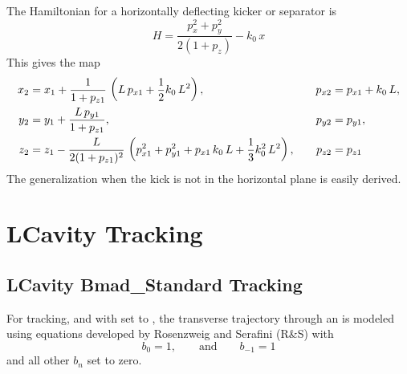 The Hamiltonian for a horizontally deflecting kicker or separator is
\begin{equation}
  H = \frac{p_x^2 + p_y^2}{2 (1 + p_z)} - k_0 \, x 
\end{equation}
This gives the map
\begin{alignat}{2}
  x_2 &= x_1 + \frac{1}{1 + p_{z1}} \, \left( L \, p_{x1} + \frac{1}{2} k_0 \, L^2 \right), &
    p_{x2} &= p_{x1} + k_0 \, L, \nonumber \\
  y_2 &= y_1 + \frac{L \, p_{y1}}{1 + p_{z1}}, &
    p_{y2} &= p_{y1},  \\
  z_2 &= z_1 - \frac{L}{2 (1 + p_{z1})^2} \, 
    \left( p_{x1}^2 + p_{y1}^2 + p_{x1} \, k_0 \, L + \frac{1}{3} k_0^2 \, L^2 \right), \quad &
  p_{z2} &= p_{z1} \nonumber
\end{alignat}
The generalization when the kick is not in the horizontal plane is easily derived.

\section{LCavity Tracking}
\label{s:lcavity.std}

\subsection{LCavity Bmad\_Standard Tracking}

For  tracking, and with  set to , the transverse
trajectory through an  is modeled using equations developed by Rosenzweig and
Serafini\cite{b:rosenzweig} (R\&S) with
\begin{equation}
  b_0 = 1, \qquad \text{and} \qquad b_{-1} = 1 
\end{equation}
and all other $b_n$ set to zero.

